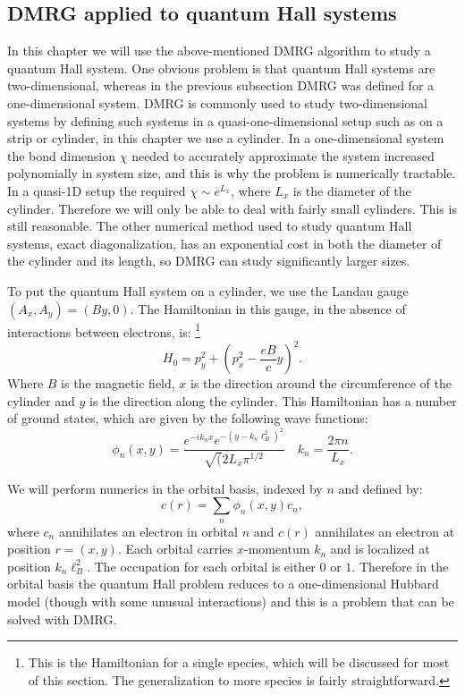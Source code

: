 \subsection{DMRG applied to quantum Hall systems}

In this chapter we will use the above-mentioned DMRG algorithm to study a quantum Hall system. One obvious problem is that quantum Hall systems are two-dimensional, whereas in the previous subsection DMRG was defined for a one-dimensional system. DMRG is commonly used to study two-dimensional systems by defining such systems in a quasi-one-dimensional setup such as on a strip or cylinder, in this chapter we use a cylinder. In a one-dimensional system the bond dimension $\chi$ needed to accurately approximate the system increased polynomially in system size, and this is why the problem is numerically tractable. In a quasi-1D setup the required $\chi\sim e^{L_x}$, where $L_x$ is the diameter of the cylinder. Therefore we will only be able to deal with fairly small cylinders. This is still reasonable. The other numerical method used to study quantum Hall systems, exact diagonalization, has an exponential cost in both the diameter of the cylinder and its length, so DMRG can study significantly larger sizes.

To put the quantum Hall system on a cylinder, we use the Landau gauge $(A_x,A_y)=(By,0)$. The Hamiltonian in this gauge, in the absence of interactions between electrons, is:
\footnote{This is the Hamiltonian for a single species, which will be discussed for most of this section. The generalization to more species is fairly straightforward\cite{ZaletelMixing}.}
\begin{equation}
H_0=p_y^2+\left(p_x^2-\frac{eB}{c}y\right)^2.
\end{equation}
Where $B$ is the magnetic field, $x$ is the direction around the circumference of the cylinder and $y$ is the direction along the cylinder. This Hamiltonian has a number of ground states, which are given by the following wave functions:
\begin{equation}
\phi_n(x,y)=\frac{e^{-ik_nx}e^{-(y-k_n\ell_B^2)^2}}{\sqrt(2L_x\pi^{1/2}} \quad k_n=\frac{2\pi n}{L_x}.
\label{formfactors}
\end{equation}

We will perform numerics in the orbital basis, indexed by $n$ and defined by:
\begin{equation}
c(r)=\sum_n \phi_n(x,y)c_n,
\end{equation}
where $c_n$ annihilates an electron in orbital $n$ and $c(r)$ annihilates an electron at position $r=(x,y)$. Each orbital carries $x$-momentum $k_n$ and is localized at position $k_n\ell_B^2$. The occupation for each orbital is either $0$ or $1$. Therefore in the orbital basis the quantum Hall problem reduces to a one-dimensional Hubbard model (though with some unusual interactions) and this is a problem that can be solved with DMRG.
 
